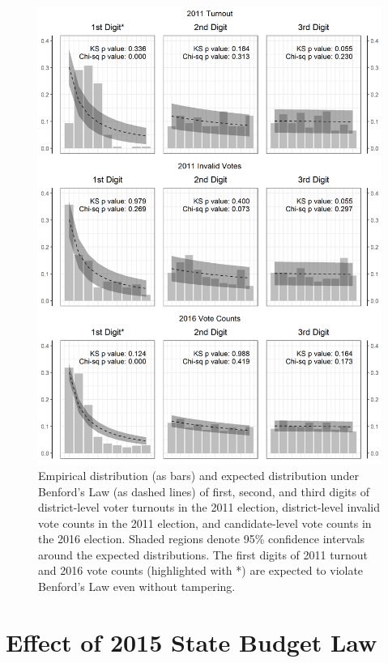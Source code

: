 \documentclass[12pt]{article}
\newcommand{\1}{\mathbbm{1}}
\begin{document}
\begin{figure}[!htbp]
	\centering
	\includegraphics[height=.85\textheight]{figure/190916_digit_test.png}
	\caption[Digit Test of Election Results]{Empirical distribution (as bars) and expected distribution under Benford's Law (as dashed lines) of first, second, and third digits of district-level voter turnouts in the 2011 election, district-level invalid vote counts in the 2011 election, and candidate-level vote counts in the 2016 election. Shaded regions denote 95\% confidence intervals around the expected distributions. The first digits of 2011 turnout and 2016 vote counts (highlighted with \textsf{*}) are expected to violate Benford's Law even without tampering.}
	\label{fig:Benford}
\end{figure}

\clearpage

\section{Effect of 2015 State Budget Law}
\label{app:budget_law}
\end{document}
